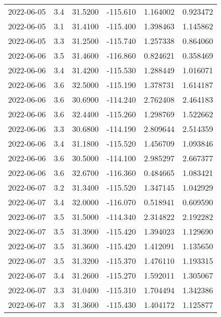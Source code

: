 \begin{tabular}{lrrrrr}
2022-06-05 &       3.4 &  31.5200 &  -115.610 &         1.164002 &         0.923472 \\
2022-06-05 &       3.1 &  31.4100 &  -115.400 &         1.398463 &         1.145862 \\
2022-06-05 &       3.3 &  31.2500 &  -115.740 &         1.257338 &         0.864060 \\
2022-06-06 &       3.5 &  31.4600 &  -116.860 &         0.824621 &         0.358469 \\
2022-06-06 &       3.4 &  31.4200 &  -115.530 &         1.288449 &         1.016071 \\
2022-06-06 &       3.6 &  32.5000 &  -115.190 &         1.378731 &         1.614187 \\
2022-06-06 &       3.6 &  30.6900 &  -114.240 &         2.762408 &         2.464183 \\
2022-06-06 &       3.6 &  32.4400 &  -115.260 &         1.298769 &         1.522662 \\
2022-06-06 &       3.3 &  30.6800 &  -114.190 &         2.809644 &         2.514359 \\
2022-06-06 &       3.4 &  31.1800 &  -115.520 &         1.456709 &         1.093846 \\
2022-06-06 &       3.6 &  30.5000 &  -114.100 &         2.985297 &         2.667377 \\
2022-06-06 &       3.6 &  32.6700 &  -116.360 &         0.484665 &         1.083421 \\
2022-06-07 &       3.2 &  31.3400 &  -115.520 &         1.347145 &         1.042929 \\
2022-06-07 &       3.4 &  32.0000 &  -116.070 &         0.518941 &         0.609590 \\
2022-06-07 &       3.5 &  31.5000 &  -114.340 &         2.314822 &         2.192282 \\
2022-06-07 &       3.5 &  31.3900 &  -115.420 &         1.394023 &         1.129690 \\
2022-06-07 &       3.5 &  31.3600 &  -115.420 &         1.412091 &         1.135650 \\
2022-06-07 &       3.5 &  31.3200 &  -115.370 &         1.476110 &         1.193315 \\
2022-06-07 &       3.4 &  31.2600 &  -115.270 &         1.592011 &         1.305067 \\
2022-06-07 &       3.3 &  31.0400 &  -115.310 &         1.704494 &         1.342386 \\
2022-06-07 &       3.3 &  31.3600 &  -115.430 &         1.404172 &         1.125877 \\

\end{tabular}
